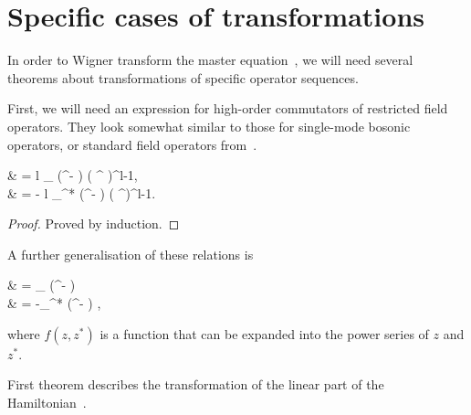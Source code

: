 \section{Specific cases of transformations}

In order to Wigner transform the master equation~, we will need several theorems about transformations of specific operator sequences.

First, we will need an expression for high-order commutators of restricted field operators.
They look somewhat similar to those for single-mode bosonic operators, or standard field operators from~\cite{Louisell1990}.

\begin{lemma}
	\begin{eqn*}
		& = l \delta_{\restbasis} (\xvec^\prime - \xvec) ( \Psiop^{\prime\dagger} )^{l-1}, \\
		& = - l \delta_{\restbasis}^* (\xvec^\prime - \xvec) ( \Psiop^\prime )^{l-1}.
	\end{eqn*}
\end{lemma}
\begin{proof}
Proved by induction.
\end{proof}

A further generalisation of these relations is

\begin{lemma}
\label{lmm:func-operators:functional-commutators}
	\begin{eqn*}
		& = \delta_{\restbasis} (\xvec^\prime - \xvec) \frac{\partial f}{\partial \Psiop^{\prime\dagger}} \\
		& = -\delta_{\restbasis}^* (\xvec^\prime - \xvec) \frac{\partial f}{\partial \Psiop^\prime},
	\end{eqn*}
	where $f(z, z^*)$ is a function that can be expanded into the power series of $z$ and $z^*$.
\end{lemma}

First theorem describes the transformation of the linear part of the Hamiltonian~.

